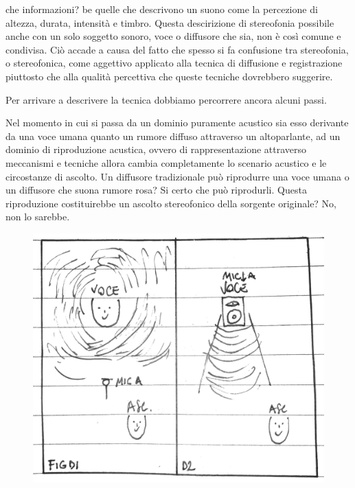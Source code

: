 che informazioni? be quelle che descrivono un suono come la percezione di altezza,
durata, intensità e timbro. Questa descirizione di stereofonia possibile anche
con un solo soggetto sonoro, voce o diffusore che sia, non è così comune e
condivisa. Ciò accade a causa del fatto che spesso si fa confusione tra stereofonia,
o stereofonica, come aggettivo applicato alla tecnica di diffusione e registrazione
piuttosto che alla qualità percettiva che queste tecniche dovrebbero suggerire.

Per arrivare a descrivere la tecnica dobbiamo percorrere ancora alcuni passi.

Nel momento in cui si passa da un dominio puramente acustico sia esso derivante
da una voce umana quanto un rumore diffuso attraverso un altoparlante, ad un
dominio di riproduzione acustica, ovvero di rappresentazione attraverso meccanismi
e tecniche allora cambia completamente lo scenario acustico e le circostanze di
ascolto. Un diffusore tradizionale può riprodurre una voce umana o un diffusore
che suona rumore rosa? Si certo che può riprodurli. Questa riproduzione
costituirebbe un ascolto stereofonico della sorgente originale? No, non lo sarebbe.

\begin{figure}[h]
\begin{center}
  \includegraphics[width=.98\linewidth]{CAPITOLI/1000/IMG/figd1d2.png}
\label{ee:figd1d2}
\end{center}
\end{figure}



